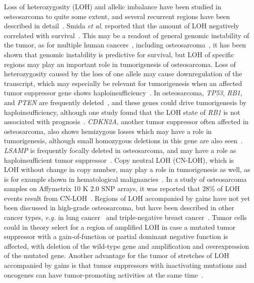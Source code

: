 Loss of heterozygosity (LOH) and allelic imbalance have been studied in osteosarcoma to quite some extent, and several recurrent regions have been described in detail~\cite{johnson2003determination,deshpande2006phc3,yen2009identification,kresse2009lsamp,pasic2010recurrent}. Smida {\it et al}. reported that the amount of LOH negatively correlated with survival~\cite{smida2010genomic}. This may be a readout of general genomic instability of the tumor, as for multiple human cancers~\cite{carter2006signature}, including osteosarcoma~\cite{kuijjer2012identification}, it has been shown that genomic instability is predictive for survival, but LOH of specific regions may play an important role in tumorigenesis of osteosarcoma. Loss of heterozygosity caused by the loss of one allele may cause downregulation of the transcript, which may especially be relevant for tumorigenesis when an affected tumor suppressor gene shows haploinsufficiency~\cite{berger2011continuum}. In osteosarcoma, {\it TP53}, {\it RB1}, and {\it PTEN} are frequently deleted~\cite{cleton2005central}, and these genes could drive tumorigenesis by haploinsufficiency, although one study found that the LOH state of {\it RB1} is not associated with prognosis~\cite{heinsohn2007determination}. {\it CDKN2A}, another tumor suppressor often affected in osteosarcoma, also shows hemizygous losses which may have a role in tumorigenesis, although small homozygous deletions in this gene are also seen~\cite{mohseny2010small}. {\it LSAMP} is frequently focally deleted in osteosarcoma, and may have a role as haploinsufficient tumor suppressor~\cite{yen2009identification,kresse2009lsamp,pasic2010recurrent}. Copy neutral LOH (CN-LOH), which is LOH without change in copy number, may play a role in tumorigenesis as well, as is for example shown in hematological malignancies~\cite{o2010copy}. In a study of osteosarcoma samples on Affymetrix 10 K 2.0 SNP arrays, it was reported that 28\% of LOH events result from CN-LOH~\cite{yen2009identification}. Regions of LOH accompanied by gains have not yet been discussed in high\hyp{}grade osteosarcoma, but have been described in other cancer types, {\it e.g.} in lung cancer~\cite{harris2011both} and triple-negative breast cancer~\cite{ha2012integrative}. Tumor cells could in theory select for a region of amplified LOH in case a mutated tumor suppressor with a gain\hyp{}of\hyp{}function or partial dominant negative function is affected, with deletion of the wild\hyp{}type gene and amplification and overexpression of the mutated gene. Another advantage for the tumor of stretches of LOH accompanied by gains is that tumor suppressors with inactivating mutations and oncogenes can have tumor\hyp{}promoting activities at the same time~\cite{bacolod2009emerging}.

